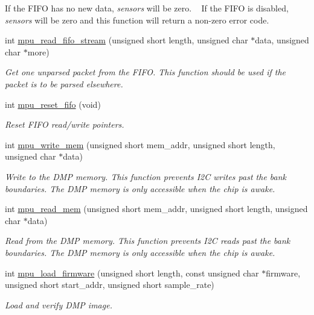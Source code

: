 \begin{DoxyCompactItemize}
\begin{DoxyCompactList}
 If the F\+I\+FO has no new data, {\itshape sensors} will be zero. ~\newline
 If the F\+I\+FO is disabled, {\itshape sensors} will be zero and this function will return a non-\/zero error code. \end{DoxyCompactList}\item 
int \hyperlink{group___d_r_i_v_e_r_s_ga13593044949b460e9f571eb57e9a0788}{mpu\+\_\+read\+\_\+fifo\+\_\+stream} (unsigned short length, unsigned char $\ast$data, unsigned char $\ast$more)
\begin{DoxyCompactList}\small\item\em Get one unparsed packet from the F\+I\+FO. This function should be used if the packet is to be parsed elsewhere. \end{DoxyCompactList}\item 
int \hyperlink{group___d_r_i_v_e_r_s_gaf23e9f57c0059be6ec57862f0584de10}{mpu\+\_\+reset\+\_\+fifo} (void)
\begin{DoxyCompactList}\small\item\em Reset F\+I\+FO read/write pointers. \end{DoxyCompactList}\item 
int \hyperlink{group___d_r_i_v_e_r_s_gafea59910bc3dd30ba3356b1c75213a5f}{mpu\+\_\+write\+\_\+mem} (unsigned short mem\+\_\+addr, unsigned short length, unsigned char $\ast$data)
\begin{DoxyCompactList}\small\item\em Write to the D\+MP memory. This function prevents I2C writes past the bank boundaries. The D\+MP memory is only accessible when the chip is awake. \end{DoxyCompactList}\item 
int \hyperlink{group___d_r_i_v_e_r_s_ga3374bececb6743893c9eab27645c1182}{mpu\+\_\+read\+\_\+mem} (unsigned short mem\+\_\+addr, unsigned short length, unsigned char $\ast$data)
\begin{DoxyCompactList}\small\item\em Read from the D\+MP memory. This function prevents I2C reads past the bank boundaries. The D\+MP memory is only accessible when the chip is awake. \end{DoxyCompactList}\item 
int \hyperlink{group___d_r_i_v_e_r_s_ga8fbdfe1a50285d4ab438e29c2efc70f5}{mpu\+\_\+load\+\_\+firmware} (unsigned short length, const unsigned char $\ast$firmware, unsigned short start\+\_\+addr, unsigned short sample\+\_\+rate)
\begin{DoxyCompactList}\small\item\em Load and verify D\+MP image. \end{DoxyCompactList}\item 

\end{DoxyCompactItemize}
